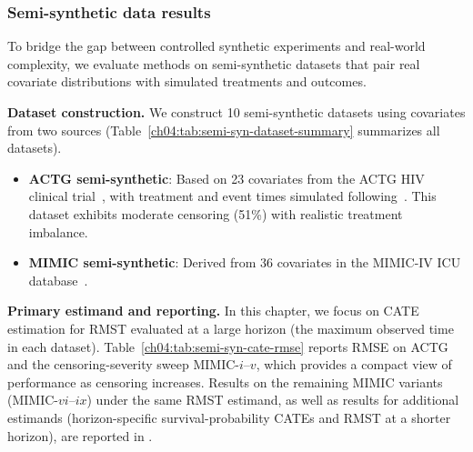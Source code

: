 \subsubsection{Semi-synthetic data results}
\label{ch04:sec:semi-syn-data-experiment}

To bridge the gap between controlled synthetic experiments and real-world complexity, we evaluate methods on semi-synthetic datasets that pair real covariate distributions with simulated treatments and outcomes.

\textbf{Dataset construction.} We construct 10 semi-synthetic datasets using covariates from two sources (Table~\ref{ch04:tab:semi-syn-dataset-summary} summarizes all datasets).
\begin{itemize}
    \item \textbf{ACTG semi-synthetic}: Based on 23 covariates from the ACTG HIV clinical trial~\citep{hammer1996atrial}, with treatment and event times simulated following~\citet{chapfuwa2021enabling}.
This dataset exhibits moderate censoring (51\%) with realistic treatment imbalance.
    \item \textbf{MIMIC semi-synthetic}: Derived from 36 covariates in the MIMIC-IV ICU database~\citep{johnson2023mimic}. 
\end{itemize}

\textbf{Primary estimand and reporting.} In this chapter, we focus on CATE estimation for RMST evaluated at a large horizon (the maximum observed time in each dataset).
Table~\ref{ch04:tab:semi-syn-cate-rmse} reports RMSE on ACTG and the censoring-severity sweep MIMIC-$i$--$v$, which provides a compact view of performance as censoring increases.
Results on the remaining MIMIC variants (MIMIC-$vi$--$ix$) under the same RMST estimand, as well as results for additional estimands (horizon-specific survival-probability CATEs and RMST at a shorter horizon), are reported in \citet[Appendix G.4, Tables 31--35]{noroozizadeh2026survhte}.


